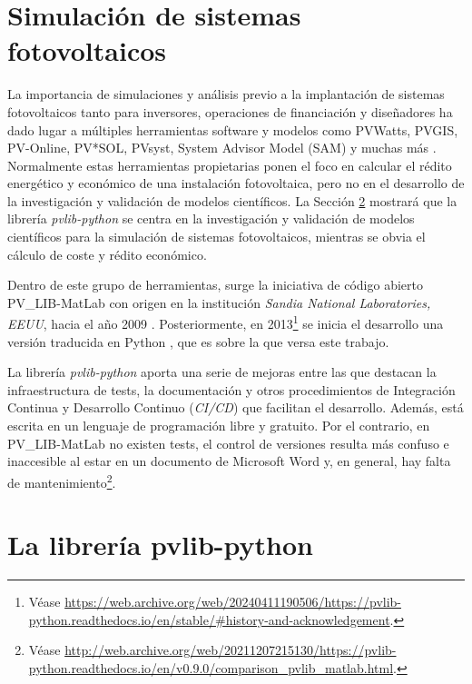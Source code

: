 \section{Simulación de sistemas fotovoltaicos} \label{sct:simulaciones}

La importancia de simulaciones y análisis previo a la implantación de sistemas fotovoltaicos tanto para inversores, operaciones de financiación y diseñadores ha dado lugar a múltiples herramientas software y modelos como PVWatts, PVGIS, PV-Online, PV*SOL, PVsyst, System Advisor Model (SAM) y muchas más \cite{stein_models_2009, Kumar_2017}. Normalmente estas herramientas propietarias ponen el foco en calcular el rédito energético y económico de una instalación fotovoltaica, pero no en el desarrollo de la investigación y validación de modelos científicos. La Sección \ref{sct:pvlib} mostrará que la librería \textit{pvlib-python} se centra en la investigación y validación de modelos científicos para la simulación de sistemas fotovoltaicos, mientras se obvia el cálculo de coste y rédito económico.

Dentro de este grupo de herramientas, surge la iniciativa de código abierto PV\_LIB-MatLab con origen en la institución \textit{Sandia National Laboratories, EEUU}, hacia el año 2009 \cite{Stein_Holmgren_Forbess_Hansen_2016}. Posteriormente, en 2013\footnote{Véase \url{https://web.archive.org/web/20240411190506/https://pvlib-python.readthedocs.io/en/stable/\#history-and-acknowledgement}.} se inicia el desarrollo una versión traducida en Python \cite{Anderson_Hansen_Holmgren_Jensen_Mikofski_Driesse_2023, Stein_2012, Andrews_Stein_Hansen_Riley_2014, Holmgren_Andrews_Lorenzo_Stein_2015, Holmgren_Groenendyk_2016}, que es sobre la que versa este trabajo.

La librería \textit{pvlib-python} aporta una serie de mejoras entre las que destacan la infraestructura de tests, la documentación y otros procedimientos de Integración Continua y Desarrollo Continuo (\textit{CI/CD}) que facilitan el desarrollo. Además, está escrita en un lenguaje de programación libre y gratuito. Por el contrario, en PV\_LIB-MatLab no existen tests, el control de versiones resulta más confuso e inaccesible al estar en un documento de Microsoft Word y, en general, hay falta de mantenimiento\footnote{Véase \url{http://web.archive.org/web/20211207215130/https://pvlib-python.readthedocs.io/en/v0.9.0/comparison_pvlib_matlab.html}.}.

\section{La librería pvlib-python} \label{sct:pvlib}

